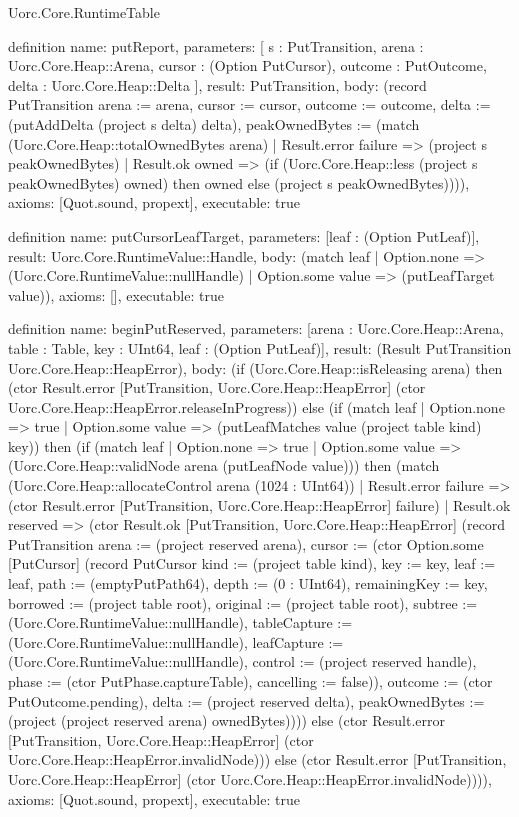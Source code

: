\begin{lexlean}{Uorc.Core.RuntimeTable}
\begin{semanticmodule}
definition{
  name: putReport,
  parameters: [
    s : PutTransition,
    arena : Uorc.Core.Heap::Arena,
    cursor : (Option PutCursor),
    outcome : PutOutcome,
    delta : Uorc.Core.Heap::Delta
  ],
  result: PutTransition,
  body: (record PutTransition {arena := arena, cursor := cursor, outcome := outcome, delta := (putAddDelta (project s delta) delta), peakOwnedBytes := (match (Uorc.Core.Heap::totalOwnedBytes arena)
    | Result.error failure => (project s peakOwnedBytes)
    | Result.ok owned => (if (Uorc.Core.Heap::less (project s peakOwnedBytes) owned) then owned else (project s peakOwnedBytes)))}),
  axioms: [Quot.sound, propext],
  executable: true
}

definition{
  name: putCursorLeafTarget,
  parameters: [leaf : (Option PutLeaf)],
  result: Uorc.Core.RuntimeValue::Handle,
  body: (match leaf
    | Option.none => (Uorc.Core.RuntimeValue::nullHandle)
    | Option.some value => (putLeafTarget value)),
  axioms: [],
  executable: true
}

definition{
  name: beginPutReserved,
  parameters: [arena : Uorc.Core.Heap::Arena, table : Table, key : UInt64, leaf : (Option PutLeaf)],
  result: (Result PutTransition Uorc.Core.Heap::HeapError),
  body: (if (Uorc.Core.Heap::isReleasing arena) then (ctor Result.error [PutTransition, Uorc.Core.Heap::HeapError] (ctor Uorc.Core.Heap::HeapError.releaseInProgress)) else (if (match leaf
    | Option.none => true
    | Option.some value => (putLeafMatches value (project table kind) key)) then (if (match leaf
    | Option.none => true
    | Option.some value => (Uorc.Core.Heap::validNode arena (putLeafNode value))) then (match (Uorc.Core.Heap::allocateControl arena (1024 : UInt64))
    | Result.error failure => (ctor Result.error [PutTransition, Uorc.Core.Heap::HeapError] failure)
    | Result.ok reserved => (ctor Result.ok [PutTransition, Uorc.Core.Heap::HeapError] (record PutTransition {arena := (project reserved arena), cursor := (ctor Option.some [PutCursor] (record PutCursor {kind := (project table kind), key := key, leaf := leaf, path := (emptyPutPath64), depth := (0 : UInt64), remainingKey := key, borrowed := (project table root), original := (project table root), subtree := (Uorc.Core.RuntimeValue::nullHandle), tableCapture := (Uorc.Core.RuntimeValue::nullHandle), leafCapture := (Uorc.Core.RuntimeValue::nullHandle), control := (project reserved handle), phase := (ctor PutPhase.captureTable), cancelling := false})), outcome := (ctor PutOutcome.pending), delta := (project reserved delta), peakOwnedBytes := (project (project reserved arena) ownedBytes)}))) else (ctor Result.error [PutTransition, Uorc.Core.Heap::HeapError] (ctor Uorc.Core.Heap::HeapError.invalidNode))) else (ctor Result.error [PutTransition, Uorc.Core.Heap::HeapError] (ctor Uorc.Core.Heap::HeapError.invalidNode)))),
  axioms: [Quot.sound, propext],
  executable: true
}


\end{semanticmodule}
\end{lexlean}
